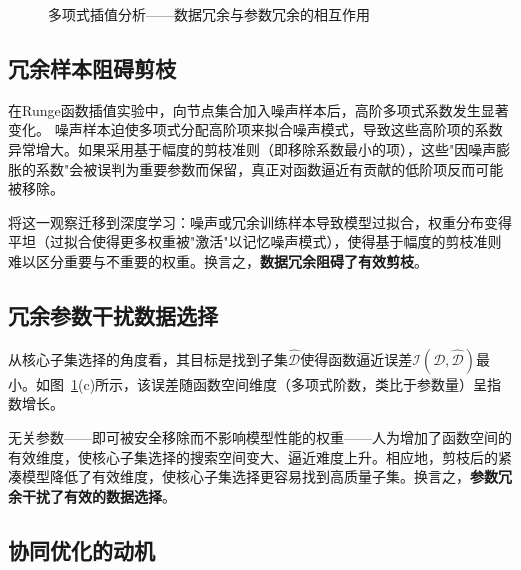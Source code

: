 \begin{figure}[htb]
  \centering
  \caption{多项式插值分析——数据冗余与参数冗余的相互作用}
  \label{fig:swast-polynomial}
\end{figure}

\subsection{冗余样本阻碍剪枝}

在Runge函数插值实验中，向节点集合加入噪声样本后，高阶多项式系数发生显著变化。%
噪声样本迫使多项式分配高阶项来拟合噪声模式，导致这些高阶项的系数异常增大。如果采用基于幅度的剪枝准则\cite{han2015learning}（即移除系数最小的项），这些"因噪声膨胀的系数"会被误判为重要参数而保留，真正对函数逼近有贡献的低阶项反而可能被移除。

将这一观察迁移到深度学习：噪声或冗余训练样本导致模型过拟合\cite{zhang2021understanding}，权重分布变得平坦（过拟合使得更多权重被"激活"以记忆噪声模式），使得基于幅度的剪枝准则难以区分重要与不重要的权重。换言之，\textbf{数据冗余阻碍了有效剪枝}。

\subsection{冗余参数干扰数据选择}

从核心子集选择的角度看，其目标是找到子集$\hat{\mathcal{D}}$使得函数逼近误差$\mathcal{I}(\mathcal{D}, \hat{\mathcal{D}})$最小。如图~\ref{fig:swast-polynomial}(c)所示，该误差随函数空间维度（多项式阶数，类比于参数量）呈指数增长。

无关参数——即可被安全移除而不影响模型性能的权重——人为增加了函数空间的有效维度，使核心子集选择的搜索空间变大、逼近难度上升。相应地，剪枝后的紧凑模型降低了有效维度，使核心子集选择更容易找到高质量子集。换言之，\textbf{参数冗余干扰了有效的数据选择}。

\subsection{协同优化的动机}

